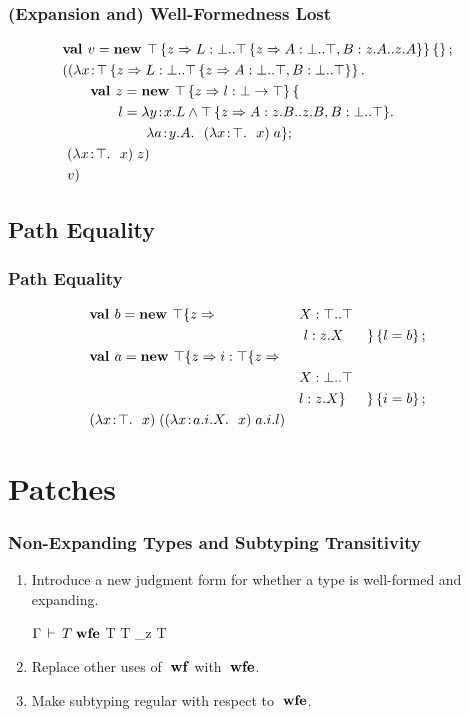 \documentclass{beamer}
\begin{document}
\begin{frame}
\frametitle{(Expansion and) Well-Formedness Lost}
\begin{align*}
&\mlnew v {\Top \refine z {\Ldecl L \Bot {\Top \refine z {\Ldecl A \Bot \Top, \Ldecl B {z.A} {z.A}}}} \ldefs{}}{
\mlapp {\abs x {\Top \refine z {\Ldecl L \Bot {\Top \refine z {\Ldecl A \Bot \Top, \Ldecl B \Bot \Top}}}} {\\&\gap
\mlnew z {\Top \refine z {\ldecl l {\Bot \tfun \Top}}\mlldefs{\\&\gap\gap l = \abs y {x.L \tand {\Top \refine z {\Ldecl A {z.B} {z.B}, \Ldecl B \Bot \Top}}} {\\&\gap\gap\gap\abs a {y.A} {\app {(\abs x \Top x)} a}}}}{
\ \app {(\abs x \Top x)} z
}}}{\ v}}
\end{align*}
\end{frame}

\subsection{Path Equality}
\begin{frame}
\frametitle{Path Equality}
\begin{align*}
&\textbf{val }b = \textbf{new }\top \{z \Rightarrow &&X : \top..\top&\\
&&&\ l : z.X& \}\left\{l = b\right\} ;\;\\&
\textbf{val }a = \textbf{new }\top \{z \Rightarrow i : \top \{z \Rightarrow &&&\\
&&&X : \bot..\top\\
&&&l : z.X \}& \}\left\{i = b\right\} ;\;\\&
(\lambda x\!:\!\top.\ \ x)\;((\lambda x\!:\!a.i.X.\ \ x)\;a.i.l)
\end{align*}
\end{frame}

\section{Patches}
\frame{\tableofcontents[currentsection]}

\begin{frame}
\frametitle{Non-Expanding Types and Subtyping Transitivity}
\begin{enumerate}
\item Introduce a new judgment form for whether a type is well-formed and expanding.
\begin{block}{$\Gamma \,\vdash\, T \;\mbox{\textbf{wfe}}$}
  \infrule
  {\Gamma \ts T \wf \spcomma T \expand_z }
  {\Gamma \ts T \wfe}
\end{block}
\item Replace other uses of $\;\mbox{\textbf{wf}}$ with $\;\mbox{\textbf{wfe}}$.
\item Make subtyping regular with respect to $\;\mbox{\textbf{wfe}}$.
\end{enumerate}
\end{frame}
\end{document}
